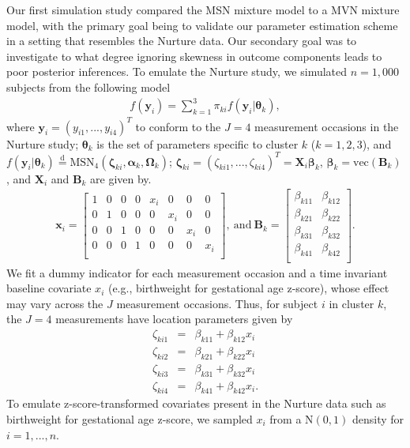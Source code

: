 \documentclass[useAMS,referee]{biom}
\begin{document}
Our first simulation study compared the MSN mixture model to a MVN mixture model, with the primary goal being to validate our parameter estimation scheme in a setting that resembles the Nurture data. Our secondary goal was to investigate to what degree ignoring skewness in outcome components leads to poor posterior inferences. To emulate the Nurture study, we simulated $n = 1,000$ subjects from the following model
\begin{eqnarray}
	\label{eq:sim1}
	f(\mathbf{y}_i) = \sum_{k = 1}^3 \pi_{ki} f(\mathbf{y}_i | \boldsymbol\theta_k),
\end{eqnarray}
where $\mathbf{y}_i = (y_{i1},...,y_{i4})^T$ to conform to the $J = 4$ measurement occasions in the Nurture study; $\boldsymbol\theta_k$ is the set of parameters specific to cluster $k$ ($k = 1,2,3$), and $f(\mathbf{y}_i | \boldsymbol\theta_k) \stackrel{\text{d}}{=} \text{MSN}_4(\boldsymbol\zeta_{ki},\boldsymbol\alpha_k,\boldsymbol\Omega_k)$; $\boldsymbol\zeta_{ki} = (\zeta_{ki1},...,\zeta_{ki4})^T = \mathbf{X}_i \boldsymbol\beta_{k}$, $\boldsymbol\beta_k = \text{vec}(\mathbf{B}_k)$, and $\mathbf{X}_i$ and $\mathbf{B}_k$ are given by. 
\begin{eqnarray}
	\mathbf{x}_i = 
	\begin{bmatrix}
		1 & 0 & 0 & 0 & x_i & 0 & 0 & 0\\
		0 & 1 & 0 & 0 & 0 & x_i & 0 & 0\\
		0 & 0 & 1 & 0 & 0 & 0 & x_i & 0\\
		0 & 0 & 0 & 1 & 0 & 0 & 0 & x_i\\
	\end{bmatrix}, \ \text{and} \ 
	\mathbf{B}_k = 
	\begin{bmatrix}
		\beta_{k11} & \beta_{k12} \\
		\beta_{k21} & \beta_{k22} \\
		\beta_{k31} & \beta_{k32} \\
		\beta_{k41} & \beta_{k42} \\
	\end{bmatrix}. \nonumber
\end{eqnarray}
We fit a dummy indicator for each measurement occasion and a time invariant baseline covariate $x_i$ (e.g., birthweight for gestational age z-score), whose effect may vary across the $J$ measurement occasions. Thus, for subject $i$ in cluster $k$, the $J = 4$ measurements have location parameters given by
\begin{eqnarray}
	\zeta_{ki1} &=& \beta_{k11} + \beta_{k12}x_i \nonumber \\
	\zeta_{ki2} &=& \beta_{k21} + \beta_{k22}x_i \nonumber \\
	\zeta_{ki3} &=& \beta_{k31} + \beta_{k32}x_i \nonumber \\
	\zeta_{ki4} &=& \beta_{k41} + \beta_{k42}x_i. \nonumber 
\end{eqnarray}
To emulate z-score-transformed covariates present in the Nurture data such as birthweight for gestational age z-score, we sampled $x_i$ from a $\text{N}(0,1)$ density for $i = 1,...,n$.
\end{document}
